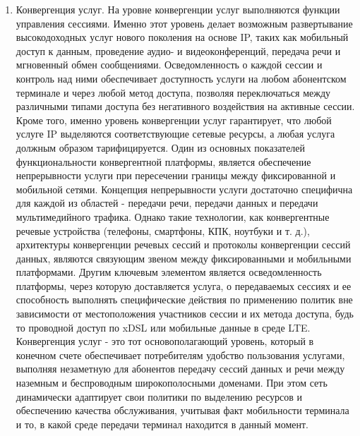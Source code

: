 \begin{enumerate}
\item Конвергенция услуг. На уровне конвергенции услуг выполняются функции управления сессиями. Именно этот уровень делает возможным развертывание высокодоходных услуг нового поколения на основе IP, таких как мобильный доступ к данным, проведение аудио- и видеоконференций, передача речи и мгновенный обмен сообщениями. Осведомленность о каждой сессии и контроль над ними обеспечивает доступность услуги на любом абонентском терминале и через любой метод доступа, позволяя переключаться между различными типами доступа без негативного воздействия на активные сессии. Кроме того, именно уровень конвергенции услуг гарантирует, что любой услуге IP выделяются соответствующие сетевые ресурсы, а любая услуга должным образом тарифицируется. Один из основных показателей функциональности конвергентной платформы, является обеспечение непрерывности услуги при пересечении границы между фиксированной и мобильной сетями. Концепция непрерывности услуги достаточно специфична для каждой из областей - передачи речи, передачи данных и передачи мультимедийного трафика. Однако такие технологии, как конвергентные речевые устройства (телефоны, смартфоны, КПК, ноутбуки и т. д.), архитектуры конвергенции речевых сессий и протоколы конвергенции сессий данных, являются связующим звеном между фиксированными и мобильными платформами. Другим ключевым элементом является осведомленность платформы, через которую доставляется услуга, о передаваемых сессиях и ее способность выполнять специфические действия по применению политик вне зависимости от местоположения участников сессии и их метода доступа, будь то проводной доступ по xDSL или мобильные данные в среде LTE. Конвергенция услуг - это тот основополагающий уровень, который в конечном счете обеспечивает потребителям удобство пользования услугами, выполняя незаметную для абонентов передачу сессий данных и речи между наземным и беспроводным широкополосными доменами. При этом сеть динамически адаптирует свои политики по выделению ресурсов и обеспечению качества обслуживания, учитывая факт мобильности терминала и то, в какой среде передачи терминал находится в данный момент.


\end{enumerate}
